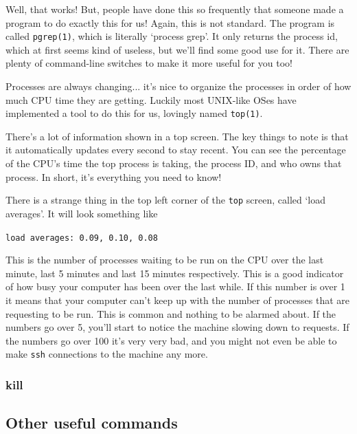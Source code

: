 Well, that works! But, people have done this so frequently that someone made a program
to do exactly this for us! Again, this is not standard. The program is called {\tt pgrep(1)},
which is literally `process grep'. It only returns the process id, which at first seems kind of useless,
but we'll find some good use for it. There are plenty of command-line switches to make it 
more useful for you too!

Processes are always changing... it's nice to organize the processes in order 
of how much CPU time they are getting. Luckily most UNIX-like OSes have implemented a
tool to do this for us, lovingly named {\tt top(1)}.


There's a lot of information shown in a top screen. The key things to note is that
it automatically updates every second to stay recent. You can see the 
percentage of the CPU's time the top process is taking, the process ID, and who owns that process.
In short, it's everything you need to know!

There is a strange thing in the top left corner of the {\tt top} screen, called `load averages'.
It will look something like

{\tt load averages: 0.09, 0.10, 0.08}

This is the number of processes waiting to be run on the CPU over the last minute, last 5 minutes and last 15 minutes respectively.
This is a good indicator of how busy your computer has been over the last while. If this number is over 1 it means that your computer
can't keep up with the number of processes that are requesting to be run. This is common and nothing to be alarmed about. If the 
numbers go over 5, you'll start to notice the machine slowing down to requests. If the numbers go over 100 it's very
very bad, and you might not even be able to make {\tt ssh} connections to the machine any more.

\subsubsection{kill}

\subsection {Other useful commands}


